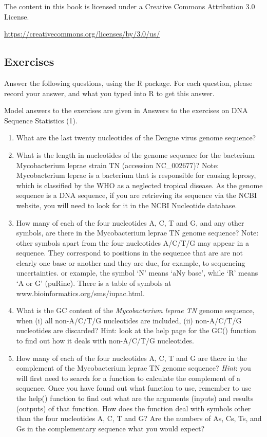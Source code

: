 \documentclass[
]{book}
\providecommand{\tightlist}{%
  \setlength{\itemsep}{0pt}\setlength{\parskip}{0pt}}
\begin{document}
The content in this book is licensed under a Creative Commons Attribution 3.0 License.

\url{https://creativecommons.org/licenses/by/3.0/us/}

\hypertarget{exercises}{%
\subsection{Exercises}\label{exercises}}

Answer the following questions, using the R package. For each question, please record your answer, and what you typed into R to get this answer.

Model answers to the exercises are given in Answers to the exercises on DNA Sequence Statistics (1).

\begin{enumerate}
\def\labelenumi{\arabic{enumi}.}
\tightlist
\item
  What are the last twenty nucleotides of the Dengue virus genome sequence?
\item
  What is the length in nucleotides of the genome sequence for the bacterium Mycobacterium leprae strain TN (accession NC\_002677)?
  Note: Mycobacterium leprae is a bacterium that is responsible for causing leprosy, which is classified by the WHO as a neglected tropical disease. As the genome sequence is a DNA sequence, if you are retrieving its sequence via the NCBI website, you will need to look for it in the NCBI Nucleotide database.
\item
  How many of each of the four nucleotides A, C, T and G, and any other symbols, are there in the Mycobacterium leprae TN genome sequence?
  Note: other symbols apart from the four nucleotides A/C/T/G may appear in a sequence. They correspond to positions in the sequence that are are not clearly one base or another and they are due, for example, to sequencing uncertainties. or example, the symbol `N' means `aNy base', while `R' means `A or G' (puRine). There is a table of symbols at www.bioinformatics.org/sms/iupac.html.
\item
  What is the GC content of the \emph{Mycobacterium leprae TN} genome sequence, when (i) all non-A/C/T/G nucleotides are included, (ii) non-A/C/T/G nucleotides are discarded?
  Hint: look at the help page for the GC() function to find out how it deals with non-A/C/T/G nucleotides.
\item
  How many of each of the four nucleotides A, C, T and G are there in the complement of the Mycobacterium leprae TN genome sequence? \emph{Hint}: you will first need to search for a function to calculate the complement of a sequence. Once you have found out what function to use, remember to use the help() function to find out what are the arguments (inputs) and results (outputs) of that function. How does the function deal with symbols other than the four nucleotides A, C, T and G? Are the numbers of As, Cs, Ts, and Gs in the complementary sequence what you would expect?

\end{enumerate}
\end{document}
